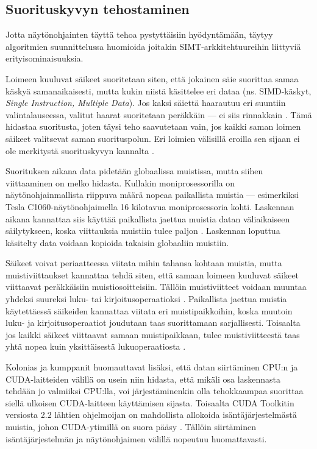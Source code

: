 \documentclass[a4paper,11pt]{article}
\newcommand{\engl}[1]{\foreignlanguage{english}{\em #1}}
\begin{document}
\subsection{Suorituskyvyn tehostaminen}

Jotta näytönohjainten täyttä tehoa pystyttäisiin hyödyntämään, täytyy algoritmien suunnittelussa huomioida joitakin SIMT-arkkitehtuureihin liittyviä erityisominaisuuksia.

Loimeen kuuluvat säikeet suoritetaan siten, että jokainen säie suorittaa samaa käskyä samanaikaisesti, mutta kukin niistä käsittelee eri dataa (ns. SIMD-käskyt, \engl{Single Instruction, Multiple Data}). Jos kaksi säiettä haarautuu eri suuntiin valintalauseessa, valitut haarat suoritetaan peräkkäin --- ei siis rinnakkain \cite{leischner2010} \cite{cederman2009}. Tämä hidastaa suoritusta, joten täysi teho saavutetaan vain, jos kaikki saman loimen säikeet valitsevat saman suorituspolun. Eri loimien välisillä eroilla sen sijaan ei ole merkitystä suorituskyvyn kannalta \cite{leischner2010} \cite{satish2009}.

Suorituksen aikana data pidetään globaalissa muistissa, mutta siihen viittaaminen on melko hidasta. Kullakin moniprosessorilla on näytönohjainmallista riippuva määrä nopeaa paikallista muistia --- esimerkiksi Tesla C1060-näytönohjaimella 16 kilotavua moniprosessoria kohti. Laskennan aikana kannattaa siis käyttää paikallista jaettua muistia datan väliaikaiseen säilytykseen, koska viittauksia muistiin tulee paljon \cite{cederman2009} \cite{leischner2010}. Laskennan loputtua käsitelty data voidaan kopioida takaisin globaaliin muistiin.

Säikeet voivat periaatteessa viitata mihin tahansa kohtaan muistia, mutta muistiviittaukset kannattaa tehdä siten, että samaan loimeen kuuluvat säikeet viittaavat peräkkäisiin muistiosoitteisiin. Tällöin muistiviitteet voidaan muuntaa yhdeksi suureksi luku- tai kirjoitusoperaatioksi \cite{cederman2009} \cite{satish2009}. Paikallista jaettua muistia käytettäessä säikeiden kannattaa viitata eri muistipaikkoihin, koska muutoin luku- ja kirjoitusoperaatiot joudutaan taas suorittamaan sarjallisesti. Toisaalta jos kaikki säikeet viittaavat samaan muistipaikkaan, tulee muistiviitteestä taas yhtä nopea kuin yksittäisestä lukuoperaatiosta \cite{cederman2009}.

Kolonias ja kumppanit \cite{kolonias2011} huomauttavat lisäksi, että datan siirtäminen CPU:n ja CUDA-laitteiden välillä on usein niin hidasta, että mikäli osa laskennasta tehdään jo valmiiksi CPU:lla, voi järjestäminenkin olla tehokkaampaa suorittaa siellä ulkoisen CUDA-laitteen käyttämisen sijasta. Toisaalta CUDA Toolkitin versiosta 2.2 lähtien ohjelmoijan on mahdollista allokoida isäntäjärjestelmästä muistia, johon CUDA-ytimillä on suora pääsy \cite{kolonias2011}. Tällöin siirtäminen isäntäjärjestelmän ja näytönohjaimen välillä nopeutuu huomattavasti.
\end{document}
